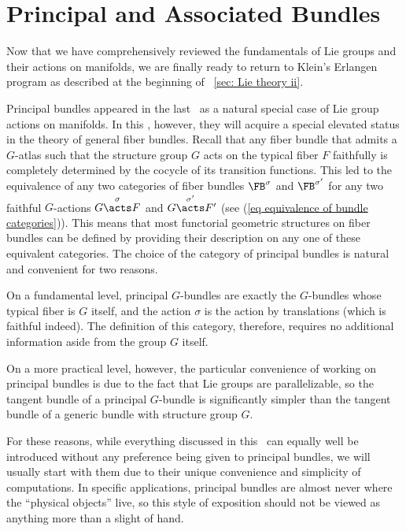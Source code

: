 \section{Principal and Associated Bundles}

    Now that we have comprehensively reviewed the fundamentals of Lie groups and their actions on manifolds, we are finally ready to return to Klein's Erlangen program as described at the beginning of \Sect~\ref{sec: Lie theory ii}.

    Principal bundles appeared in the last \sect\ as a natural special case of Lie group actions on manifolds. In this \sect, however, they will acquire a special elevated status in the theory of general fiber bundles. Recall that any fiber bundle that admits a $G$-atlas such that the structure group $G$ acts on the typical fiber $F$ faithfully is completely determined by the cocycle of its transition functions. This led to the equivalence of any two categories of fiber bundles $\FB^\sigma$ and $\FB^{\sigma'}$ for any two faithful $G$-actions $G\overset{\sigma}{\acts}F$ and $G\overset{\sigma'}{\acts}F'$ (see (\ref{eq equivalence of bundle categories})). This means that most functorial geometric structures on fiber bundles can be defined by providing their description on any one of these equivalent categories. The choice of the category of principal bundles is natural and convenient for two reasons. 
    
    On a fundamental level, principal $G$-bundles are exactly the $G$-bundles whose typical fiber is $G$ itself, and the action $\sigma$ is the action by translations (which is faithful indeed). The definition of this category, therefore, requires no additional information aside from the group $G$ itself. 
    
    On a more practical level, however, the particular convenience of working on principal bundles is due to the fact that Lie groups are parallelizable, so the tangent bundle of a principal $G$-bundle is significantly simpler than the tangent bundle of a generic bundle with structure group $G$. 

    For these reasons, while everything discussed in this \sect\ can equally well be introduced without any preference being given to principal bundles, we will usually start with them due to their unique convenience and simplicity of computations. In specific applications, principal bundles are almost never where the ``physical objects'' live, so this style of exposition should not be viewed as anything more than a slight of hand.



